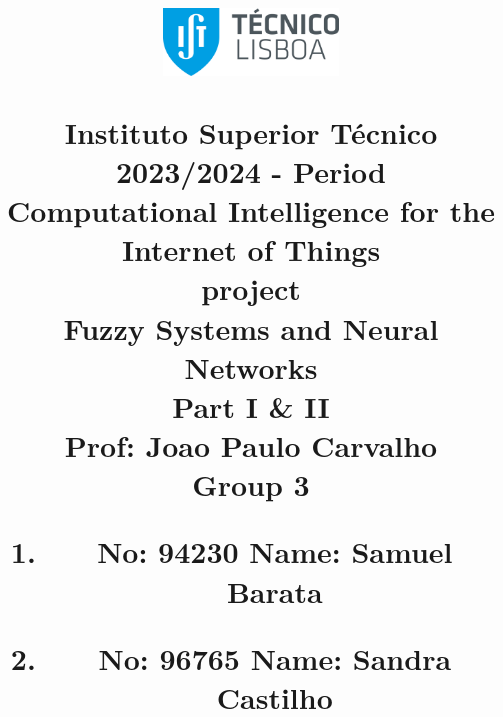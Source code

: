 \title{
\centering
\includegraphics[width=0.35\textwidth]{capa/logo.png}\par\vspace{1cm}
\normalfont \large
Instituto Superior Técnico\\
\vspace{5mm}
\normalsize 2023/2024 -  Period \\
\vspace{15mm}
\huge \textbf{Computational Intelligence for the Internet of Things}\\
\vspace{15mm}
\huge { project}\\
\huge {Fuzzy Systems and Neural Networks}\\
\LARGE {Part I \& II}\\
\normalsize
\vspace{5mm}
\textbf{Prof:} Joao Paulo Carvalho\\
\vspace{15mm}
Group 3
\vspace{5mm}
\begin{enumerate}
    \centering
    \item \textbf{No:} 94230  \hspace{2cm} \textbf{Name:} Samuel Barata
    \item \textbf{No:} 96765  \hspace{2cm} \textbf{Name:} Sandra Castilho
\end{enumerate}
\vspace{25mm}
}
